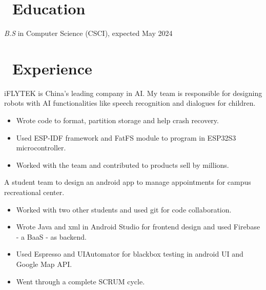 \documentclass{resume}
\begin{document}



\section{\faGraduationCap\ Education}
\textit{B.S} in Computer Science (CSCI), expected May 2024

\section{\faUsers\ Experience}
  iFLYTEK is China's leading company in AI. My team is responsible for designing robots with AI functionalities like speech recognition and dialogues for children.
\begin{itemize}
  \item Wrote code to format, partition storage and help crash recovery.
  \item Used ESP-IDF framework and FatFS module to program in ESP32S3 microcontroller.
  \item Worked with the team and contributed to products sell by millions.
\end{itemize}

  A student team to design an android app to manage appointments for campus recreational center.
\begin{itemize}
  \item Worked with two other students and used git for code collaboration.
  \item Wrote Java and xml in Android Studio for frontend design and used Firebase - a BaaS - as backend.
  \item Used Espresso and UIAutomator for blackbox testing in android UI and Google Map API.
  \item Went through a complete SCRUM cycle.
\end{itemize}
\end{document}
